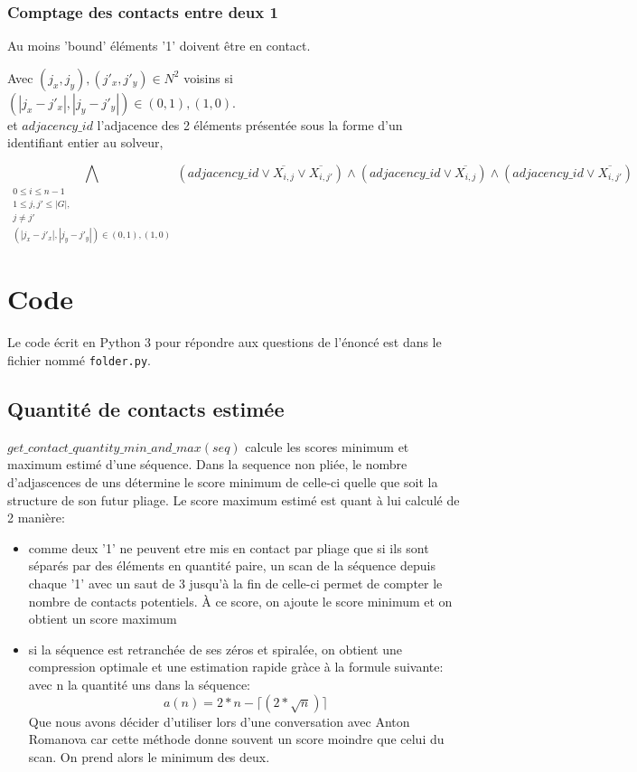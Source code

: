 \documentclass[utf8]{article}
\begin{document}
\subsubsection{Comptage des contacts entre deux 1}
Au moins 'bound' éléments '1' doivent être en contact.

Avec  $(j_x, j_y), (j'_x, j'_y) \in N^2$
 voisins si $(|j_x - j'_x|, |j_y - j'_y|) \in {(0, 1), (1, 0)}.$
\\et $adjacency\_id$ l'adjacence des 2 éléments présentée sous la forme d'un identifiant entier au solveur,

\begin{center}
    \[ \bigwedge_{\substack{0\leq i\leq n-1
    \\1\leq j , j'\leq |G|,\>
    \\ j\neq j'
    \\(|j_x - j'_x|, |j_y - j'_y|) \in {(0, 1), (1, 0)}}} (adjacency\_id \vee \overline{X_{i,j}} \vee \overline{X_{i,j'}}) \wedge (adjacency\_id \vee \overline{X_{i,j}}) \wedge (adjacency\_id \vee \overline{X_{i,j'}}) \]
\end{center}

\section{Code}
Le code écrit en Python 3 pour répondre aux questions de l'énoncé est dans le fichier nommé \verb|folder.py|.

\subsection{Quantité de contacts estimée}
$ get\_contact\_quantity\_min\_and\_max(seq)$ calcule les scores minimum et maximum estimé d'une séquence.
Dans la sequence non pliée, le nombre d'adjascences de uns détermine le score minimum de celle-ci quelle que soit la structure de son futur pliage.
Le score maximum estimé est quant à lui calculé de 2 manière:
\begin{itemize}

    \item comme deux '1' ne peuvent etre mis en contact par pliage que si ils sont séparés par des éléments en quantité paire, un scan de la séquence depuis chaque '1' avec un saut de 3 jusqu'à la fin de celle-ci permet de compter le nombre de contacts potentiels. À ce score, on ajoute le score minimum et on obtient un score maximum
    \item si la séquence est retranchée de ses zéros et spiralée, on obtient une compression optimale et une estimation rapide gràce à la formule suivante:
    avec n la quantité uns dans la séquence:
    \begin{equation}
        a(n) = 2*n - \lceil(2*\sqrt{n})\rceil
    \end{equation}
    Que nous avons décider d'utiliser lors d'une conversation avec Anton Romanova car cette méthode donne souvent un score moindre que celui du scan.
    On prend alors le minimum des deux.
\end{itemize}
\end{document}
